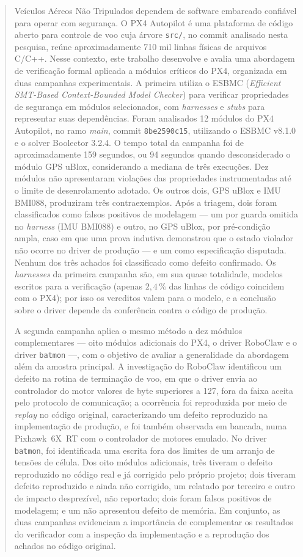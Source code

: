\begin{abstract}

Veículos Aéreos Não Tripulados dependem de software embarcado confiável para operar com segurança. O PX4 Autopilot é uma plataforma de código aberto para controle de voo cuja árvore \texttt{src/}, no commit analisado nesta pesquisa, reúne aproximadamente 710 mil linhas físicas de arquivos C/C++. Nesse contexto, este trabalho desenvolve e avalia uma abordagem de verificação formal aplicada a módulos críticos do PX4, organizada em duas campanhas experimentais. A primeira utiliza o ESBMC (\textit{Efficient SMT-Based Context-Bounded Model Checker}) para verificar propriedades de segurança em módulos selecionados, com \textit{harnesses} e \textit{stubs} para representar suas dependências. Foram analisados 12 módulos do PX4 Autopilot, no ramo \textit{main}, commit \texttt{8be2590c15}, utilizando o ESBMC v8.1.0 e o solver Boolector 3.2.4. O tempo total da campanha foi de aproximadamente 159 segundos, ou 94 segundos quando desconsiderado o módulo GPS uBlox, considerando a mediana de três execuções. Dez módulos não apresentaram violações das propriedades instrumentadas até o limite de desenrolamento adotado. Os outros dois, GPS uBlox e IMU BMI088, produziram três contraexemplos. Após a triagem, dois foram classificados como falsos positivos de modelagem --- um por guarda omitida no \textit{harness} (IMU BMI088) e outro, no GPS uBlox, por pré-condição ampla, caso em que uma prova indutiva demonstrou que o estado violador não ocorre no driver de produção --- e um como especificação disputada. Nenhum dos três achados foi classificado como defeito confirmado. Os \textit{harnesses} da primeira campanha são, em sua quase totalidade, modelos escritos para a verificação (apenas $2{,}4\,\%$ das linhas de código coincidem com o PX4); por isso os vereditos valem para o modelo, e a conclusão sobre o driver depende da conferência contra o código de produção.

A segunda campanha aplica o mesmo método a dez módulos complementares --- oito módulos adicionais do PX4, o driver RoboClaw e o driver \texttt{batmon} ---, com o objetivo de avaliar a generalidade da abordagem além da amostra principal. A investigação do RoboClaw identificou um defeito na rotina de terminação de voo, em que o driver envia ao controlador do motor valores de byte superiores a 127, fora da faixa aceita pelo protocolo de comunicação; a ocorrência foi reproduzida por meio de \textit{replay} no código original, caracterizando um defeito reproduzido na implementação de produção, e foi também observada em bancada, numa Pixhawk~6X~RT com o controlador de motores emulado. No driver \texttt{batmon}, foi identificada uma escrita fora dos limites de um arranjo de tensões de célula. Dos oito módulos adicionais, três tiveram o defeito reproduzido no código real e já corrigido pelo próprio projeto; dois tiveram defeito reproduzido e ainda não corrigido, um relatado por terceiro e outro de impacto desprezível, não reportado; dois foram falsos positivos de modelagem; e um não apresentou defeito de memória. Em conjunto, as duas campanhas evidenciam a importância de complementar os resultados do verificador com a inspeção da implementação e a reprodução dos achados no código original.


\end{abstract}
